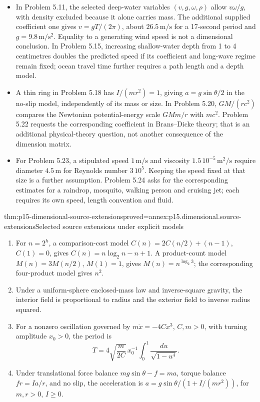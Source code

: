 \begin{itemize}
\(\kappa_1,\kappa_2\), not thickness and area alone.
\item In Problem 5.11, the selected deep-water variables
\((v,g,\omega,\rho)\) allow \(v\omega/g\), with density excluded because
it alone carries mass. The additional supplied coefficient one gives
\(v=gT/(2\pi)\), about \(26.5\,\mathrm{m/s}\) for a 17-second period
and \(g=9.8\,\mathrm{m/s^2}\). Equality to a generating wind speed is
not a dimensional conclusion. In Problem 5.15, increasing shallow-water
depth from 1 to 4 centimetres doubles the predicted speed if its coefficient
and long-wave regime remain fixed; ocean travel time further requires a
path length and a depth model.
\item A thin ring in Problem 5.18 has \(I/(mr^2)=1\), giving
\(a=g\sin\theta/2\) in the no-slip model, independently of its mass or
size. In Problem 5.20, \(GM/(rc^2)\) compares the Newtonian potential-energy
scale \(GMm/r\) with \(mc^2\). Problem 5.22 requests the corresponding
coefficient in Brans--Dicke theory; that is an additional physical-theory
question, not another consequence of the dimension matrix.
\item For Problem 5.23, a stipulated speed \(1\,\mathrm{m/s}\) and
viscosity \(1.5\,10^{-5}\,\mathrm{m^2/s}\) require diameter
\(4.5\,\mathrm m\) for Reynolds number \(3\,10^5\). Keeping the speed
fixed at that size is a further assumption. Problem 5.24 asks for the
corresponding estimates for a raindrop, mosquito, walking person and
cruising jet; each requires its own speed, length convention and fluid.
\end{itemize}


\begin{hbtheorem}{thm:p15-dimensional-source-extensions}{proved=annex:p15.dimensional.source-extensions}{Selected source extensions under explicit models}
\begin{enumerate}
\item For \(n=2^h\), a comparison-cost model
\(C(n)=2C(n/2)+(n-1)\), \(C(1)=0\), gives
\(C(n)=n\log_2n-n+1\). A product-count model
\(M(n)=3M(n/2)\), \(M(1)=1\), gives
\(M(n)=n^{\log_2 3}\); the corresponding four-product model gives \(n^2\).
\item Under a uniform-sphere enclosed-mass law and inverse-square gravity,
the interior field is proportional to radius and the exterior field to
inverse radius squared.
\item For a nonzero oscillation governed by \(m\ddot x=-4Cx^3\),
\(C,m>0\), with turning amplitude \(x_0>0\), the period is
\[
 T=4\sqrt{\frac m{2C}}\,x_0^{-1}
       \int_0^1\frac{du}{\sqrt{1-u^4}}.
\]
\item Under translational force balance \(mg\sin\theta-f=ma\),
torque balance \(fr=I a/r\), and no slip, the acceleration is
\(a=g\sin\theta/(1+I/(mr^2))\), for \(m,r>0\), \(I\geq0\).
\end{enumerate}
\end{hbtheorem}

